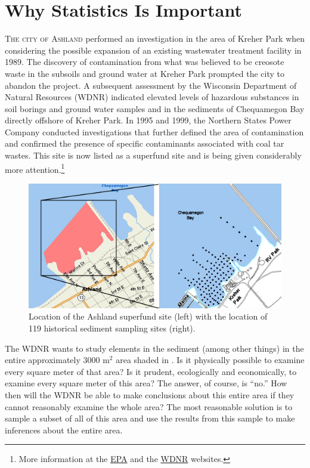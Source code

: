 \documentclass[10pt,openany]{book}\usepackage[]{graphicx}\usepackage[]{color}
\begin{document}
\section{Why Statistics Is Important}\label{sect:WhyStats}
\lettrine{T}{he city of Ashland} performed an investigation in the area of Kreher Park  when considering the possible expansion of an existing wastewater treatment facility in 1989.  The discovery of contamination from what was believed to be creosote waste in the subsoils and ground water at Kreher Park prompted the city to abandon the project. A subsequent assessment by the Wisconsin Department of Natural Resources (WDNR) indicated elevated levels of hazardous substances in soil borings and ground water samples and in the sediments of Chequamegon Bay directly offshore of Kreher Park.  In 1995 and 1999, the Northern States Power Company conducted investigations that further defined the area of contamination and confirmed the presence of specific contaminants associated with coal tar wastes.  This site is now listed as a superfund site and is being given considerably more attention.\footnote{More information at the \href{https://cumulis.epa.gov/supercpad/cursites/csitinfo.cfm?id=0507952}{EPA} and the \href{http://dnr.wi.gov/topic/brownfields/ashland.html}{WDNR} websites.}

\begin{figure}[htbp]
  \centering
    \includegraphics[width=6in]{Figs/Kreher_Park_Map.png}
  \caption{Location of the Ashland superfund site (left) with the location of 119 historical sediment sampling sites (right).}
  \label{fig:KreherParkMap}
\end{figure}

The WDNR wants to study elements in the sediment (among other things) in the entire approximately 3000 m$^2$ area shaded in .  Is it physically possible to examine every square meter of that area?  Is it prudent, ecologically and economically, to examine every square meter of this area?  The answer, of course, is ``no.''  How then will the WDNR be able to make conclusions about this entire area if they cannot reasonably examine the whole area?  The most reasonable solution is to sample a subset of all of this area and use the results from this sample to make inferences about the entire area.
\end{document}
